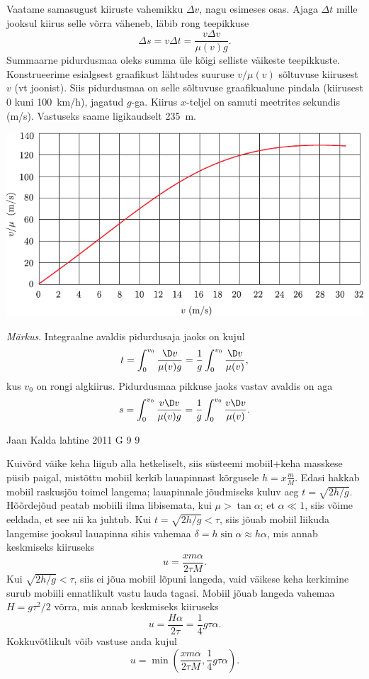\documentclass[11pt]{article}
\begin{document}
{{\osa Vaatame samasugust kiiruste vahemikku $\Delta v$, nagu esimeses osas. Ajaga $\Delta t$ mille jooksul kiirus selle võrra väheneb, läbib rong teepikkuse
\[
\Delta s = v\Delta t = \frac{v\Delta v}{\mu (v)g}.
\]
Summaarne pidurdusmaa oleks summa üle kõigi selliste väikeste teepikkuste. Konstrueerime esialgsest graafikust lähtudes suuruse $v/\mu (v)$ sõltuvuse kiirusest $v$ (vt joonist). Siis pidurdusmaa on selle sõltuvuse graafikualune pindala (kiirusest \num{0} kuni \SI{100}{km/h}), jagatud $g$-ga. Kiirus $x$-teljel on samuti meetrites sekundis (\si{m/s}). Vastuseks saame ligikaudselt \SI{235}{m}.

\begin{center}
	\includegraphics[width=\linewidth]{2006-lahg-10-lah2}
\end{center}

\emph{Märkus}. Integraalne avaldis pidurdusaja jaoks on kujul
\[
t=\int_{0}^{v_{0}} \frac{\D v}{\mu(v) g}=\frac{1}{g} \int_{0}^{v_{0}} \frac{\D v}{\mu(v)},
\]
kus $v_0$ on rongi algkiirus. Pidurdusmaa pikkuse jaoks vastav avaldis on aga
\[
s=\int_{0}^{v_{0}} \frac{v \D v}{\mu(v) g}=\frac{1}{g} \int_{0}^{v_{0}} \frac{v \D v}{\mu(v)}.
\]
\fi
}

{Jaan Kalda} %
{lahtine} %
{2011} %
{G 9} %
{9} %
{

\ifSolution
Kuivõrd väike keha liigub alla hetkeliselt, siis süsteemi mobiil+keha masskese püsib paigal, mistõttu mobiil kerkib lauapinnast kõrgusele $h=x\frac mM$.
Edasi hakkab mobiil raskusjõu toimel langema; lauapinnale jõudmiseks kuluv aeg $t=\sqrt{2h/g}$. Hõõrdejõud peatab mobiili ilma libisemata, kui $\mu>\tan\alpha$; et
$\alpha \ll 1$, siis võime eeldada, et see nii ka juhtub. Kui $t=\sqrt{2h/g}<\tau$, siis jõuab mobiil liikuda langemise jooksul lauapinna sihis vahemaa $\delta=h\sin\alpha\approx h\alpha$,
mis annab keskmiseks kiiruseks $$u=\frac{xm\alpha}{2\tau M}.$$ Kui $\sqrt{2h/g}<\tau$, siis ei jõua mobiil lõpuni langeda, vaid väikese keha kerkimine surub mobiili ennatlikult vastu lauda tagasi.
Mobiil jõuab langeda vahemaa $H=g\tau^2/2$ võrra, mis annab keskmiseks kiiruseks
$$u=\frac{H\alpha}{2\tau}=\frac 14 g\tau\alpha.$$
Kokkuvõtlikult võib vastuse anda kujul
$$u=\min\left(\frac{xm\alpha}{2\tau M}, \frac 14 g\tau\alpha\right).$$
\fi
}

}
\end{document}
